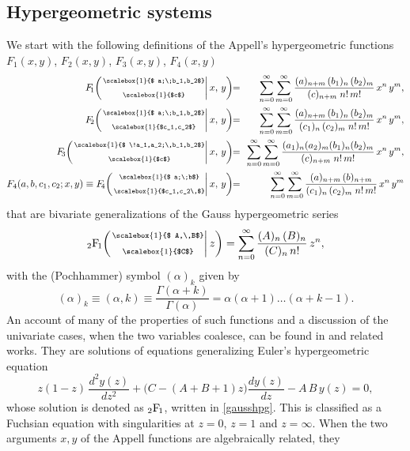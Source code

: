\documentclass[a4paper,11pt,openright,twoside]{book}
\newcommand*{\Scale}[2][4]{\scalebox{#1}{$#2$}}%
\newcommand{\app}[4]{F_{\!#1}\!
	\left(\left.\substack{\Scale[1]{ #2} \\[1.5ex] \Scale[1]{#3}}\right| #4 \right) }
\newcommand{\hpg}[5]{{}_{#1}\mbox{\rm F}_{\!#2}\!
	\left(\left.\substack{\Scale[1]{ #3} \\[1.5ex] \Scale[1]{#4}}\right| #5 \right) }
\newcommand{\hpgo}[2]{{}_{#1}\mbox{\rm F}_{\!#2}}
\newcommand{\equal}{&\!\!=\!\! &}
\numberwithin{equation}{section}
\begin{document}
\subsection{Hypergeometric systems} 
We start with the following definitions of the Appell's hypergeometric functions $F_1(x,y)$, $F_2(x,y)$, $F_3(x,y)$, $F_4(x,y)$  %
\begin{eqnarray} \label{appf1}
	\app 1{a;\;b_1,b_2}{c}{x,\,y} \equal \sum_{n=0}^{\infty} \sum_{m=0}^{\infty}
	\frac{(a)_{n+m}\,(b_1)_n\,(b_2)_m}{(c)_{n+m}\;n!\,m!}\,x^n\,y^m,\\ \label{appf2}
	\app 2{a;\;b_1,b_2}{c_1,c_2}{x,\,y} \equal \sum_{n=0}^{\infty} \sum_{m=0}^{\infty}
	\frac{(a)_{n+m}\,(b_1)_n\,(b_2)_m}{(c_1)_n\,(c_2)_m\;n!\,m!}\,x^n\,y^m,\\ \label{appf3}
	\app 3{\!a_1,a_2;\,b_1,b_2}{c}{x,\,y} \equal \sum_{n=0}^{\infty} \sum_{m=0}^{\infty}
	\frac{(a_1)_n(a_2)_m(b_1)_n(b_2)_m}{(c)_{n+m}\;n!\,m!}\,x^n\,y^m,\\ \label{appf4}
	F_4(a,b,c_1,c_2; x,y)\equiv\app 4{a;\;b}{c_1,c_2\,}{x,\,y} \equal \sum_{n=0}^{\infty} \sum_{m=0}^{\infty}
	\frac{(a)_{n+m}\,(b)_{n+m}}{(c_1)_n\,(c_2)_m\;n!\,m!}\,x^n\,y^m
\end{eqnarray}
that are bivariate generalizations of the Gauss hypergeometric series
\begin{equation} \label{gausshpg}
	\hpg21{A,\,B}{C}{z} = \sum_{n=0}^{\infty} 
	\frac{(A)_{n}\,(B)_n}{(C)_n\,n!}\,z^n,
\end{equation}
with the (Pochhammer) symbol $(\alpha)_{k}$ given by
\begin{equation}
	(\alpha)_{k}\equiv (\alpha,k)\equiv\frac{\Gamma(\alpha+k)}{\Gamma(\alpha)}=\alpha(\alpha+1)\dots(\alpha+k-1).\label{Pochh}
\end{equation}
An account of many of the properties of such functions and a discussion of the univariate cases, when the two variables coalesce, can be found in \cite{Vidunas1} and related works. They are solutions of equations generalizing Euler's hypergeometric equation 
\begin{equation} \label{eq:euler}
	z(1-z)\,\frac{d^2y(z)}{dz^2}+
	\big(C-(A+B+1)z\big)\frac{dy(z)}{dz}-A\,B\,y(z)=0,
\end{equation}
whose solution is denoted as $\hpgo21$, written in \eqref{gausshpg}.
This is classified as a Fuchsian equation with singularities at $z=0$, $z=1$ and $z=\infty$. 
When the two arguments $x,y$ of the Appell functions are algebraically related, they 
\end{document}
